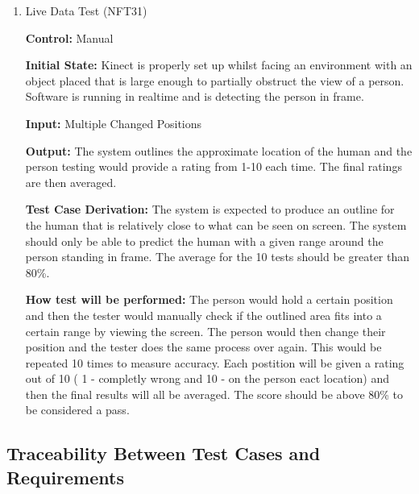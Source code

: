 \documentclass[12pt, titlepage]{article}
\begin{document}
\begin{enumerate}

\item{Live Data Test (NFT31)\label{NFT31}\\}

\textbf{Control:} Manual

\textbf{Initial State:} Kinect is properly set up whilst facing an environment with an object placed that is large enough to partially obstruct the view of a person. Software is running in realtime and is detecting the person in frame.

\textbf{Input:} Multiple Changed Positions 

\textbf{Output:} The system outlines the approximate location of the human and the person testing would provide a rating from 1-10 each time. The final ratings are then averaged.

\textbf{Test Case Derivation:} The system is expected to produce an outline for the human that is relatively close to what can be seen on screen. The system should only be able to predict the human with a given range around the person standing in frame. The average for the 10 tests should be greater than 80\%. 

\textbf{How test will be performed:} The person would hold a certain position and then the tester would manually check if the outlined area fits into a certain range by viewing the screen. The person would then change their position and the tester does the same process over again. This would be repeated 10 times to measure accuracy. Each postition will be given a rating out of 10 ( 1 - completly wrong and 10 - on the person eact location) and then the final results will all be averaged. The score should be above 80\% to be considered a pass.
  
\end{enumerate}


\subsection{Traceability Between Test Cases and Requirements}
\end{document}
